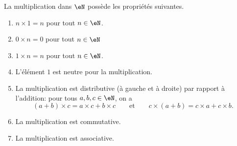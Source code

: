 \begin{proposition}     \label{PROPooGHDOooFYRmon}
	La multiplication dans \( \eN \) possède les propriétés suivantes.
	\begin{enumerate}
		\item       \label{ITEMooHFWRooDCEpjj}
		    \( n\times 1=n\) pour tout \( n\in \eN\).
		\item       \label{ITEMooNBYKooXnGRrf}
		    \( 0\times n=0\) pour tout \( n\in \eN\)
		\item       \label{ITEMooRSYMooSUrRsl}
		    \( 1\times n=n\) pour tout \( n\in \eN\).
	  	\item       \label{ITEMooLJQBooVpUxUv}
		    L'élément \( 1\) est neutre pour la multiplication.
		\item       \label{ITEMooDYLIooETIBEL}
		    La multiplication est distributive (à gauche et à droite) par rapport à l'addition: pour tous \( a, b, c \in \eN \), on a
			\begin{equation}
				(a + b) \times c = a \times c + b \times c \qquad\text{et}\qquad c \times (a + b) = c \times a + c \times b.
			\end{equation}
		\item       \label{ITEMooWJPOooRUYjwQ}
		    La multiplication est commutative.
		\item       \label{ITEMooQBFSooWGDQYX}
		    La multiplication est associative.
	\end{enumerate}
\end{proposition}

